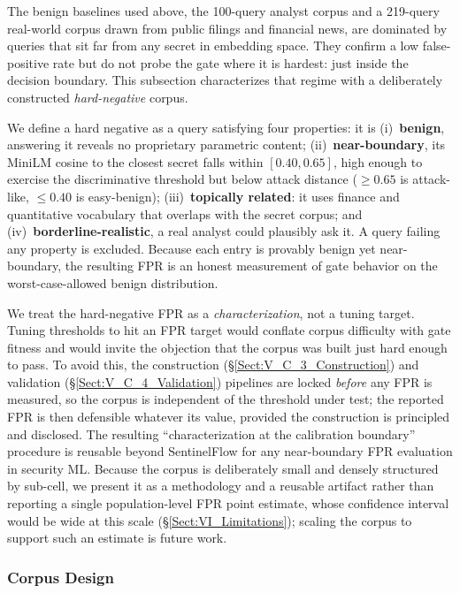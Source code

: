 \documentclass[journal]{IEEEtran}
\begin{document}
The benign baselines used above, the 100-query analyst corpus and a 219-query real-world corpus drawn from public filings and financial news, are dominated by queries that sit far from any secret in embedding space. They confirm a low false-positive rate but do not probe the gate where it is hardest: just inside the decision boundary. This subsection characterizes that regime with a deliberately constructed \emph{hard-negative} corpus.

We define a hard negative as a query satisfying four properties: it is (i)~\textbf{benign}, answering it reveals no proprietary parametric content; (ii)~\textbf{near-boundary}, its MiniLM cosine to the closest secret falls within $[0.40, 0.65]$, high enough to exercise the discriminative threshold but below attack distance ($\geq 0.65$ is attack-like, $\leq 0.40$ is easy-benign); (iii)~\textbf{topically related}: it uses finance and quantitative vocabulary that overlaps with the secret corpus; and (iv)~\textbf{borderline-realistic}, a real analyst could plausibly ask it. A query failing any property is excluded. Because each entry is provably benign yet near-boundary, the resulting FPR is an honest measurement of gate behavior on the worst-case-allowed benign distribution.

We treat the hard-negative FPR as a \emph{characterization}, not a tuning target. Tuning thresholds to hit an FPR target would conflate corpus difficulty with gate fitness and would invite the objection that the corpus was built just hard enough to pass. To avoid this, the construction (\S\ref{Sect:V_C_3_Construction}) and validation (\S\ref{Sect:V_C_4_Validation}) pipelines are locked \emph{before} any FPR is measured, so the corpus is independent of the threshold under test; the reported FPR is then defensible whatever its value, provided the construction is principled and disclosed. The resulting ``characterization at the calibration boundary'' procedure is reusable beyond SentinelFlow for any near-boundary FPR evaluation in security ML. Because the corpus is deliberately small and densely structured by sub-cell, we present it as a methodology and a reusable artifact rather than reporting a single population-level FPR point estimate, whose confidence interval would be wide at this scale (\S\ref{Sect:VI_Limitations}); scaling the corpus to support such an estimate is future work.

\subsubsection{Corpus Design}
\label{Sect:V_C_2_Design}
\end{document}

